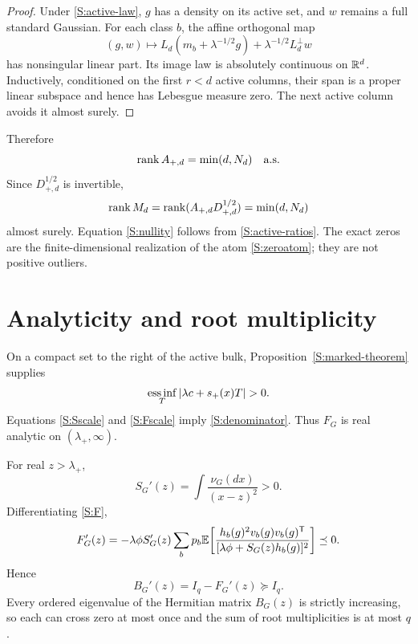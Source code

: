 \documentclass[
  aps,
  prl,
  10pt,
  onecolumn,
  longbibliography,
  nofootinbib
]{revtex4-2}
\theoremstyle{remark}
\begin{document}
\begin{proof}
Under \eqref{S:active-law}, $g$ has a density on its active set, and $w$ remains a full standard Gaussian. For each class $b$, the affine orthogonal map
\begin{equation}
(g,w)\mapsto
L_d(m_b+\lambda^{-1/2}g)
+\lambda^{-1/2}L_d^\perp w
\end{equation}
has nonsingular linear part. Its image law is absolutely continuous on $\mathbb{R}^d$. Inductively, conditioned on the first $r<d$ active columns, their span is a proper linear subspace and hence has Lebesgue measure zero. The next active column avoids it almost surely.
\end{proof}

Therefore
\begin{equation}
\operatorname{rank} A_{+,d}=\min(d,N_d)\quad\text{a.s.}
\end{equation}
Since $D_{+,d}^{1/2}$ is invertible,
\begin{equation}
\operatorname{rank} M_d
=\operatorname{rank}(A_{+,d}D_{+,d}^{1/2})
=\min(d,N_d)
\end{equation}
almost surely. Equation \eqref{S:nullity} follows from \eqref{S:active-ratios}. The exact zeros are the finite-dimensional realization of the atom \eqref{S:zeroatom}; they are not positive outliers.

\section{Analyticity and root multiplicity}

On a compact set to the right of the active bulk, Proposition~\ref{S:marked-theorem} supplies
\begin{equation}
\essinf_T|\lambda c+s_+(x)T|>0.
\end{equation}
Equations \eqref{S:Sscale} and \eqref{S:Fscale} imply \eqref{S:denominator}. Thus $F_G$ is real analytic on $(\lambda_+,\infty)$.

For real $z>\lambda_+$,
\begin{equation}
S_G'(z)=\int\frac{\nu_G(dx)}{(x-z)^2}>0.
\label{S:Sprime}
\end{equation}
Differentiating \eqref{S:F},
\begin{equation}
F_G'(z)=
-\lambda\phi S_G'(z)\sum_bp_b\mathbb{E}\!\left[
\frac{h_b(g)^2v_b(g)v_b(g)^{\mathsf T}}
{[\lambda\phi+S_G(z)h_b(g)]^2}
\right]\preceq0.
\label{S:Fprime}
\end{equation}
Hence
\begin{equation}
B_G'(z)=I_q-F_G'(z)\succeq I_q.
\label{S:Bprime}
\end{equation}
Every ordered eigenvalue of the Hermitian matrix $B_G(z)$ is strictly increasing, so each can cross zero at most once and the sum of root multiplicities is at most $q$.
\end{document}
